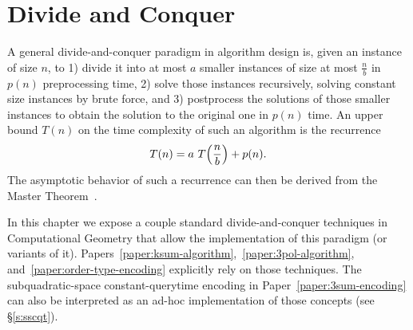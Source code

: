\chapter{Divide and Conquer}%
\label{chapter:divide-and-conquer}

A general divide-and-conquer paradigm in algorithm design is,
given an instance of size \(n\), to 1) divide it into at most
\(a\) smaller instances of size at most \(\frac{n}{b}\) in \(p(n)\)
preprocessing time, 2) solve those instances recursively,
solving constant size instances by brute force, and 3) postprocess the
solutions of those smaller instances to obtain the solution to the original
one in \(p(n)\) time.
%
An upper bound \(T(n)\) on the time complexity of such an algorithm is the
recurrence
\begin{displaymath}
	T(n) = a \,\, T\mleft(\frac nb\mright) + p(n).
\end{displaymath}
%
The asymptotic behavior of such a recurrence can then be derived from the
Master Theorem~\cite{BHS80,CLRS09}.

In this chapter we expose a couple standard divide-and-conquer techniques in
Computational Geometry that allow the implementation of this paradigm (or
variants of it).
%
Papers~\ref{paper:ksum-algorithm},~\ref{paper:3pol-algorithm},
and~\ref{paper:order-type-encoding} explicitly rely on those techniques.
%
The subquadratic-space constant-querytime encoding in
Paper~\ref{paper:3sum-encoding} can also be interpreted as an ad-hoc
implementation of those concepts (see \S\ref{s:sscqt}).




